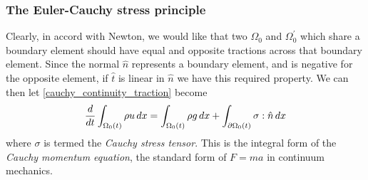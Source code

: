 \subsubsection{The Euler-Cauchy stress principle}\label{stress_principle}
Clearly, in accord with Newton, we would like that two $\Omega_0$ and $\Omega_0^\prime$
which share a boundary element should have equal and opposite tractions across that boundary element.
Since the normal $\hat{n}$ represents a boundary element, and is negative for the opposite element, if $\hat{t}$ is linear in $\hat{n}$ we have this required
property. We can then let \eqref{cauchy_continuity_traction} become
\begin{equation}\label{cauchy_continuity}
    \frac{d}{dt}\int_{\Omega_0(t)}\rho u\,dx = \int_{{\Omega_0}(t)} \rho g\,dx + \int_{{\partial\Omega_0}(t)}\sigma:\hat{n}\,dx
\end{equation}
where $\sigma$ is termed the \textit{Cauchy stress tensor}.
This is the integral form of the \textit{Cauchy momentum equation}, the standard
form of $F = ma$ in continuum mechanics.


